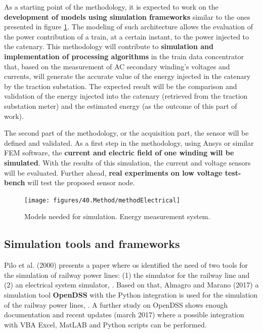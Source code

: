 As a starting point of the methodology, it is expected to work on the \textbf{development of models using simulation frameworks} similar to the ones presented in figure \ref{fig:4.methodElectrical}. The modeling of such architecture allows the evaluation of the power contribution of a train, at a certain instant, to the power injected to the catenary. This methodology will contribute to \textbf{simulation and implementation of processing algorithms} in the train data concentrator that, based on the measurement of \ac{AC} secondary winding's voltages and currents, will generate the accurate value of the energy injected in the catenary by the traction substation. The expected result will be the comparison and validation of the energy injected into the catenary (retrieved from the traction substation meter) and the estimated energy (as the outcome of this part of work).

The second part of the methodology, or the acquisition part, the sensor will be defined and validated. As a first step in the methodology, using Ansys or similar \ac{FEM} software, the \textbf{current and electric field of one winding will be simulated}. With the results of this simulation, the current and voltage sensors will be evaluated. Further ahead, \textbf{real experiments on low voltage test-bench} will test the proposed sensor node.



\begin{figure}[h!]
	\centering
	\texttt{[image: figures/40.Method/methodElectrical]}
	\caption{Models needed for simulation. Energy measurement system.}
	\label{fig:4.methodElectrical}
\end{figure}



\subsection{Simulation tools and frameworks}

Pilo et al. (2000) presents a paper where os identified the need of two tools for the simulation of railway power lines: (1) the simulator for the railway line and (2) an electrical system simulator, \cite{pilo2000}. Based on that,  Almagro and Marano (2017) a simulation tool \textbf{OpenDSS} with the Python integration is used for the simulation of the railway power lines, \cite{almagro2017}. A further study on OpenDSS shows enough documentation and recent updates (march 2017) where a possible integration with VBA Excel, MatLAB and Python scripts can be performed.

